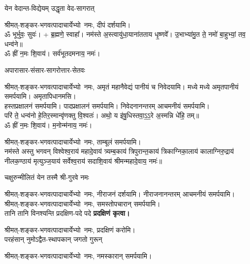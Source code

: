 \begin{center}
{येन वेदान्त-विद्येयम् उद्धृता वेद-सागरात्}

श्रीमत्-शङ्कर-भगवत्पादाचार्येभ्यो~नमः, दीपं दर्शयामि।\\


ॐ भूर्भुवः॒ सुवः॑। + ब्र॒ह्मणे॒ स्वाहा᳚। नम॑स्ते अ॒स्त्वायु॑धा॒याना॑तताय धृ॒ष्णवे᳚। उ॒भाभ्या॑मु॒त ते॒ नमो॑ बा॒हुभ्यां॒ तव॒ धन्व॑ने॥\\
ॐ ह्रीं न॒मः शि॒वाय॑। सर्व॑भूतदमनाय॒ नमः॑। 

{अपारासार-संसार-सागरोत्तार-सेतवः}

श्रीमत्-शङ्कर-भगवत्पादाचार्येभ्यो~नमः, अमृतं महानैवेद्यं पानीयं च निवेदयामि। मध्ये मध्ये अमृतपानीयं समर्पयामि। अमृतापिधानमसि।\\
हस्तप्रक्षालनं समर्पयामि। पादप्रक्षालनं समर्पयामि। निवेदनानन्तरम् आचमनीयं समर्पयामि।\\


परि॑ ते॒ धन्व॑नो हे॒तिर॒स्मान्वृ॑णक्तु वि॒श्वतः॑। अथो॒ य इ॑षु॒धिस्तवा॒ऽ॒ऽ॒रे अ॒स्मन्नि धे॑हि॒ तम्॥\\
ॐ ह्रीं न॒मः शि॒वाय॑। म॒नोन्म॑नाय॒ नमः॑। 


श्रीमत्-शङ्कर-भगवत्पादाचार्येभ्यो~नमः, ताम्बूलं समर्पयामि।\\

नम॑स्ते अस्तु भगवन् विश्वेश्व॒राय॑ महादे॒वाय॑ त्र्यम्ब॒काय॑ त्रिपुरान्त॒काय॑ त्रिकाग्निका॒लाय॑ कालाग्निरु॒द्राय॑ नीलक॒ण्ठाय॑ मृत्युञ्ज॒याय॑ सर्वेश्व॒राय॑ सदाशि॒वाय॑ श्रीमन्महादे॒वाय॒ नमः॑॥

{चक्षुरुन्मीलितं येन तस्मै श्री-गुरवे नमः}

श्रीमत्-शङ्कर-भगवत्पादाचार्येभ्यो~नमः, नीराजनं दर्शयामि। नीराजनानन्तरम् आचमनीयं समर्पयामि।\\

श्रीमत्-शङ्कर-भगवत्पादाचार्येभ्यो~नमः, समस्तोपचारान् समर्पयामि।\\


{तानि तानि विनश्यन्ति प्रदक्षिण-पदे पदे}
\textbf{प्रदक्षिणं कृत्वा।}
\medskip

श्रीमत्-शङ्कर-भगवत्पादाचार्येभ्यो~नमः, प्रदक्षिणं करोमि।\\

{परहंसान् नुमोऽद्वैत-स्थापकान् जगतो गुरून्}

श्रीमत्-शङ्कर-भगवत्पादाचार्येभ्यो~नमः, नमस्कारान् समर्पयामि।\\


\end{center}
